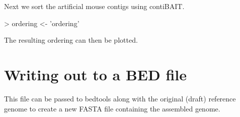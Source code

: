 \documentclass{article}
\begin{document}
Next we sort the artificial mouse contigs using contiBAIT.
\begin{Schunk}
\begin{Sinput}
>   ordering <- 'ordering'
\end{Sinput}
\end{Schunk}
The resulting ordering can then be plotted.

\section{Writing out to a BED file}
This file can be passed to bedtools along with the original (draft) reference genome to create a new FASTA file containing the assembled genome.
\end{document}
